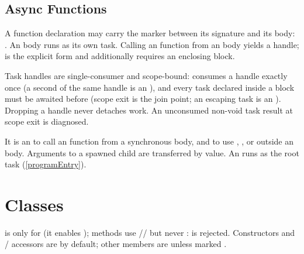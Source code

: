 \documentclass[makeidx]{article}
\begin{document}
\subsection{Async Functions}

\LMHash{}%
A function declaration may carry the  marker between its
signature and its body: .
An  body runs as its own task. Calling an 
function from an  body yields a  handle;
 is the explicit form and additionally requires an
enclosing  block.

\LMHash{}%
Task handles are single-consumer and scope-bound:  consumes
a handle exactly once (a second  of the same handle is an
), and every task declared inside a
 block must be awaited before  (scope exit is the
join point; an escaping task is an ).
Dropping a handle never detaches work. An unconsumed non-void task
result at scope exit is diagnosed.

\LMHash{}%
It is an  to call an  function
from a synchronous body, and to use , ,
 or  outside an  body.
Arguments to a spawned child are transferred by value. An 
 runs as the root task (\ref{programEntry}).


\section{Classes}

\LMHash{}%
 is only for  (it enables );
methods use // but never
:  is rejected. Constructors and
/ accessors are  by default; other
members are  unless marked .
\end{document}
